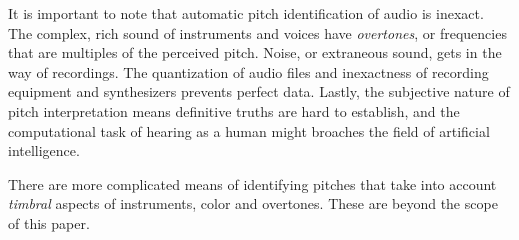 It is important to note that automatic pitch identification of audio is inexact. The complex, rich sound of instruments and voices have \textit{overtones}, or frequencies that are multiples of the perceived pitch. Noise, or extraneous sound, gets in the way of recordings. The quantization of audio files and inexactness of recording equipment and synthesizers prevents perfect data. Lastly, the subjective nature of pitch interpretation means definitive truths are hard to establish, and the computational task of hearing as a human might broaches the field of artificial intelligence.

There are more complicated means of identifying pitches that take into account \textit{timbral} aspects of instruments, color and overtones. These are beyond the scope of this paper.